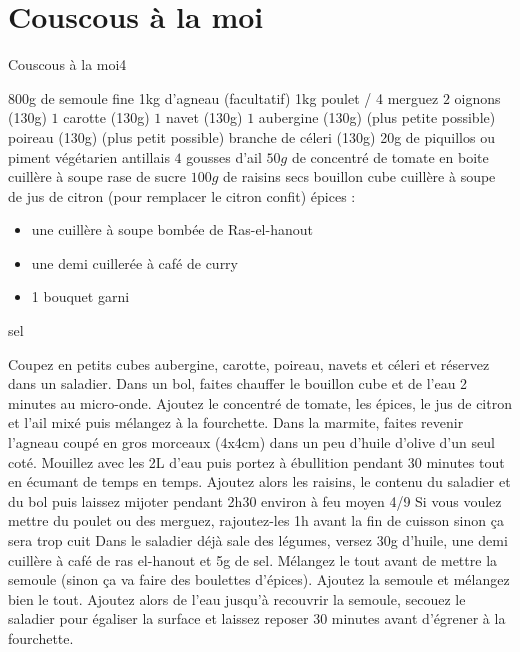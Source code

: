 {\section{Couscous à la moi}
\begin{recette}{Couscous à la moi}{4}{}{}
\begin{ingredients}[8 pers.]
\ingredient 800g de semoule fine
\ingredient 1kg d'agneau
\ingredient (facultatif) 1kg poulet / 4 merguez
\ingredient $2$ oignons (130g)
\ingredient $1$ carotte (130g)
\ingredient $1$ navet (130g)
\ingredient $1$ aubergine (130g) (plus petite possible)
 poireau (130g)  (plus petit possible)
 branche de céleri (130g)
\ingredient[falcultatif] 20g de piquillos ou piment végétarien antillais
\ingredient $4$ gousses d'ail
\ingredient $50\unit{g}$ de concentré de tomate en boite %
 cuillère à soupe rase de sucre
\ingredient $100\unit{g}$ de raisins secs
 bouillon cube
 cuillère à soupe de jus de citron (pour remplacer le citron confit)
\ingredient épices : \begin{itemize}
		\item une cuillère à soupe bombée de Ras-el-hanout
		\item une demi cuillerée à café de curry
		\item 1 bouquet garni
		\end{itemize}
\ingredient sel
\end{ingredients}

\begin{preparation}
\etape Coupez en petits cubes aubergine, carotte, poireau, navets et céleri et réservez dans un saladier.
\etape Dans un bol, faites chauffer le bouillon cube et de l'eau 2 minutes au micro-onde. Ajoutez le concentré de tomate, les épices, le jus de citron et l'ail mixé puis mélangez à la fourchette. 
\etape Dans la marmite, faites revenir l'agneau coupé en gros morceaux (4x4cm) dans un peu d'huile d'olive d'un seul coté.
\etape Mouillez avec les 2L d'eau puis portez à ébullition pendant 30 minutes tout en écumant de temps en temps. 
\etape Ajoutez alors les raisins, le contenu du saladier et du bol puis laissez mijoter pendant 2h30 environ à feu moyen 4/9
\etape Si vous voulez mettre du poulet ou des merguez, rajoutez-les 1h avant la fin de cuisson sinon ça sera trop cuit
\etape Dans le saladier déjà sale des légumes, versez 30g d'huile, une demi cuillère à café de ras el-hanout et 5g de sel. Mélangez le tout avant de mettre la semoule (sinon ça va faire des boulettes d'épices).
\etape Ajoutez la semoule et mélangez bien le tout. 
\etape Ajoutez alors de l'eau jusqu'à recouvrir la semoule, secouez le saladier pour égaliser la surface et laissez reposer 30 minutes avant d'égrener à la fourchette.
\end{preparation}
\end{recette}



}
